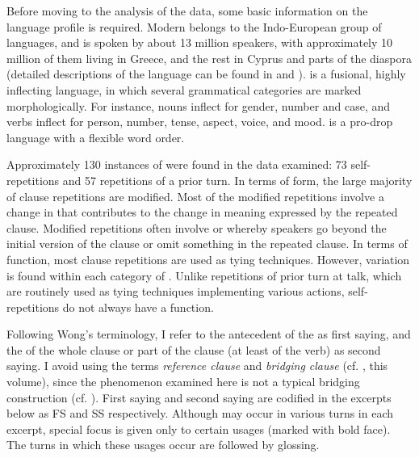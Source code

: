 \documentclass[output=paper]{LSP/langsci}
\begin{document}
Before moving to the analysis of the data, some basic information on the language profile is required. Modern  belongs to the Indo-European group of languages, and is spoken by about 13 million speakers, with approximately 10 million of them living in Greece, and the rest in Cyprus and parts of the  diaspora (detailed descriptions of the language can be found in \citealt{joseph87} and \citealt{Mackridge85}).  is a fusional, highly inflecting language, in which several grammatical categories are marked morphologically. For instance, nouns inflect for gender, number and case, and verbs inflect for person, number, tense, aspect, voice, and mood.  is a pro-drop language with a flexible word order.

Approximately 130 instances of  were found in the data examined: 73 self-repetitions and 57 repetitions of a prior turn. In terms of form, the large majority of clause repetitions are modified. Most of the modified repetitions involve a change in  that contributes to the change in meaning expressed by the repeated clause. Modified repetitions often involve  or  whereby speakers go beyond the initial version of the clause or omit something in the repeated clause. In terms of function, most clause repetitions are used as tying techniques. However, variation is found within each category of . Unlike repetitions of prior turn at talk, which are routinely used as tying techniques implementing various actions, self-repetitions do not always have a  function. 

Following Wong’s \citeyear{wong10} terminology, I refer to the antecedent of the  as first saying, and the  of the whole clause or part of the clause (at least of the verb) as second saying. I avoid using the terms \textit{reference clause} and \textit{bridging clause} (cf. \citeauthor{guerin18}, this volume), since the phenomenon examined here is not a typical bridging construction (cf. ). First saying and second saying are codified in the excerpts below as FS and SS respectively. Although  may occur in various turns in each excerpt, special focus is given only to certain usages (marked with bold face). The turns in which these usages occur are followed by glossing. 
\end{document}
